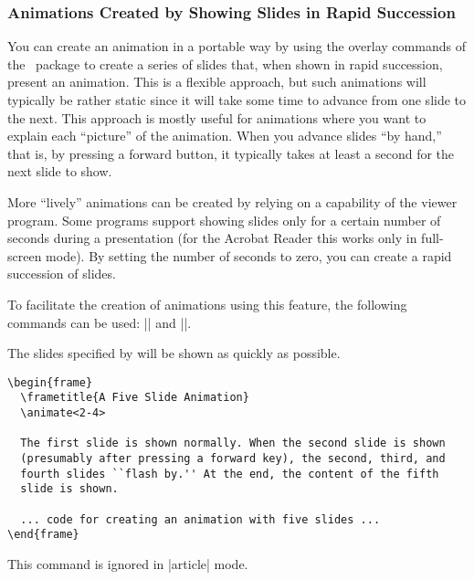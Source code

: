 \subsubsection{Animations Created by Showing Slides in Rapid Succession}

You can create an animation in a portable way by using the overlay commands of the \beamer\ package to create a series of slides that, when shown in rapid succession, present an animation. This is a flexible approach, but such animations will typically be rather static since it will take some time to advance from one slide to the next. This approach is mostly useful for animations where you want to explain each ``picture'' of the animation. When you advance slides ``by hand,'' that is, by pressing a forward button, it typically takes at least a second for the next slide to show.

More ``lively'' animations can be created by relying on a capability of the viewer program. Some programs support showing slides only for a certain number of seconds during a presentation (for the Acrobat Reader this works only in full-screen mode). By setting the number of seconds to zero, you can create a rapid succession of slides.

To facilitate the creation of animations using this feature, the following commands can be used: |\animate| and |\animatevalue|.

\begin{command}{\animate{}}
  The slides specified by  will be shown as quickly as possible.

  \example
\begin{verbatim}
\begin{frame}
  \frametitle{A Five Slide Animation}
  \animate<2-4>

  The first slide is shown normally. When the second slide is shown
  (presumably after pressing a forward key), the second, third, and
  fourth slides ``flash by.'' At the end, the content of the fifth
  slide is shown.

  ... code for creating an animation with five slides ...
\end{frame}
\end{verbatim}

  \articlenote
  This command is ignored in |article| mode.
\end{command}

